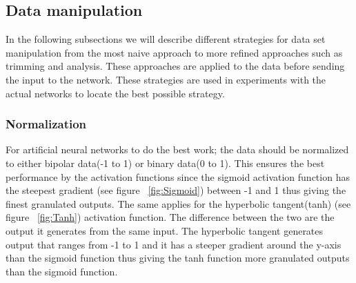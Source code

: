 \subsection{Data manipulation}
In the following subsections we will describe different strategies for data set manipulation from the most naive approach to more refined approaches such as trimming and analysis. These approaches are applied to the data before sending the input to the network. These strategies are used in experiments with the actual networks to locate the best possible strategy.

\subsubsection{Normalization}
For artificial neural networks to do the best work; the data should be normalized to either bipolar data(-1 to 1) or binary data(0 to 1). This ensures the best performance by the activation functions since the sigmoid activation function has the steepest gradient (see figure ~\ref{fig:Sigmoid}) between -1 and 1 thus giving the finest granulated outputs. The same applies for the hyperbolic tangent(tanh) (see figure ~\ref{fig:Tanh}) activation function. The difference between the two are the output it generates from the same input. The hyperbolic tangent generates output that ranges from -1 to 1 and it has a steeper gradient around the y-axis than the sigmoid function thus giving the tanh function more granulated outputs than the sigmoid function.
